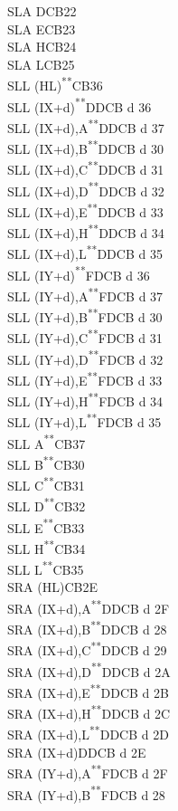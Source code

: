 \documentclass[twoside,openright,a4paper]{book}
\newcommand{\UNDOC}{\textnormal{\textsuperscript{**}}}
\begin{document}
\begin{multicols}{3}
{\begin{tabbing}
	SLA D\>CB22\\
	SLA E\>CB23\\
	SLA H\>CB24\\
	SLA L\>CB25\\
	SLL (HL)\UNDOC\>CB36\\
	SLL (IX+d)\UNDOC\>DDCB d 36\\
	SLL (IX+d),A\UNDOC\>DDCB d 37\\
	SLL (IX+d),B\UNDOC\>DDCB d 30\\
	SLL (IX+d),C\UNDOC\>DDCB d 31\\
	SLL (IX+d),D\UNDOC\>DDCB d 32\\
	SLL (IX+d),E\UNDOC\>DDCB d 33\\
	SLL (IX+d),H\UNDOC\>DDCB d 34\\
	SLL (IX+d),L\UNDOC\>DDCB d 35\\
	SLL (IY+d)\UNDOC\>FDCB d 36\\
	SLL (IY+d),A\UNDOC\>FDCB d 37\\
	SLL (IY+d),B\UNDOC\>FDCB d 30\\
	SLL (IY+d),C\UNDOC\>FDCB d 31\\
	SLL (IY+d),D\UNDOC\>FDCB d 32\\
	SLL (IY+d),E\UNDOC\>FDCB d 33\\
	SLL (IY+d),H\UNDOC\>FDCB d 34\\
	SLL (IY+d),L\UNDOC\>FDCB d 35\\
	SLL A\UNDOC\>CB37\\
	SLL B\UNDOC\>CB30\\
	SLL C\UNDOC\>CB31\\
	SLL D\UNDOC\>CB32\\
	SLL E\UNDOC\>CB33\\
	SLL H\UNDOC\>CB34\\
	SLL L\UNDOC\>CB35\\
	SRA (HL)\>CB2E\\
	SRA (IX+d),A\UNDOC\>DDCB d 2F\\
	SRA (IX+d),B\UNDOC\>DDCB d 28\\
	SRA (IX+d),C\UNDOC\>DDCB d 29\\
	SRA (IX+d),D\UNDOC\>DDCB d 2A\\
	SRA (IX+d),E\UNDOC\>DDCB d 2B\\
	SRA (IX+d),H\UNDOC\>DDCB d 2C\\
	SRA (IX+d),L\UNDOC\>DDCB d 2D\\
	SRA (IX+d)\>DDCB d 2E\\
	SRA (IY+d),A\UNDOC\>FDCB d 2F\\
	SRA (IY+d),B\UNDOC\>FDCB d 28\\

\end{tabbing}}
\end{multicols}
\end{document}

